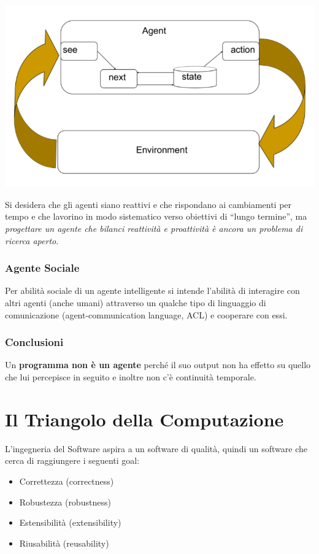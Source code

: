 \begin{center}
    \includegraphics[scale=0.4]{images/agenti proattivi.PNG}
\end{center}

Si desidera che gli agenti siano reattivi e che rispondano ai cambiamenti per tempo e che lavorino in modo sistematico verso obiettivi di “lungo termine”, ma \textit{progettare un agente che bilanci reattività e proattività è ancora un problema di ricerca aperto}.

\subsubsection{Agente Sociale}
Per abilità sociale di un agente intelligente si intende l’abilità di interagire con altri agenti (anche umani) attraverso un qualche tipo di linguaggio di comunicazione (agent-communication language, ACL) e cooperare con essi.

\subsubsection{Conclusioni}
Un \textbf{programma non è un agente} perché il suo output non ha effetto su quello che lui percepisce in seguito e inoltre non c'è continuità temporale.

\newpage

\section{Il Triangolo della Computazione}
L'ingegneria del Software aspira a un software di qualità, quindi un software che cerca di raggiungere i seguenti goal:
\begin{itemize}
    \item Correttezza (correctness)
    \item Robustezza (robustness)
    \item Estensibilità (extensibility)
    \item Riusabilità (reusability)
\end{itemize}

